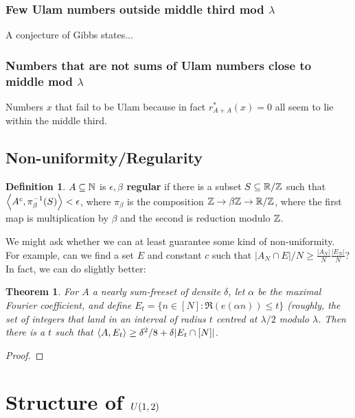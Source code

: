 \documentclass{article}
\newtheorem{theorem}{Theorem}[section]
\theoremstyle{definition}
\newtheorem{definition}{Definition}
\theoremstyle{remark}
\numberwithin{equation}{section}
\begin{document}
{\color{red}

\subsubsection{Few Ulam numbers outside middle third mod $\lambda$}

A conjecture of Gibbs states...

\subsubsection{Numbers that are not sums of Ulam numbers close to middle mod $\lambda$}

Numbers $x$ that fail to be Ulam because in fact $r^*_{A+A}(x) = 0$
all seem to lie within the middle third.  

\subsection{Non-uniformity/Regularity}


\begin{definition}$A \subseteq \mathbb{N}$ is \textbf{$\epsilon, \beta$ regular}
  if there is a subset $S \subseteq \mathbb{R}/\mathbb{Z}$ such that
  $\left<A^c, \pi_\beta^{-1}(S)\right> < \epsilon$, where $\pi_\beta$ is the
  composition $\mathbb{Z} \to \beta\mathbb{Z} \to \mathbb{R}/\mathbb{Z}$, where the first map is
  multiplication by $\beta$ and the second is reduction modulo $\mathbb{Z}$.
\end{definition}


We might ask whether we can at least guarantee some kind of
non-uniformity.  For example, can we find a set $E$ and constant $c$
such that $|A_N \cap E|/N \geq \frac{|A_N|}{N}\frac{|E_N|}{N}$?  In
fact, we can do slightly better: 

\begin{theorem}
  For $A$ a nearly sum-freeset of densite $\delta$, let $\alpha$ be
  the maximal Fourier coefficient, and define
  $E_{t} = \{n \in [N] : \Re(e(\alpha n)) \leq t\}$ (roughly, the set
  of integers that land in an interval of radius $t$ centred at
  $\lambda/2$ modulo $\lambda$.  Then there is a $t$ such that
  $\left<A,E_t\right> \geq \delta^2/8 + \delta |E_t \cap [N]|$.  
\end{theorem}

\begin{proof}

\end{proof}

\section{Structure of $U(1,2)$}

}
\end{document}

